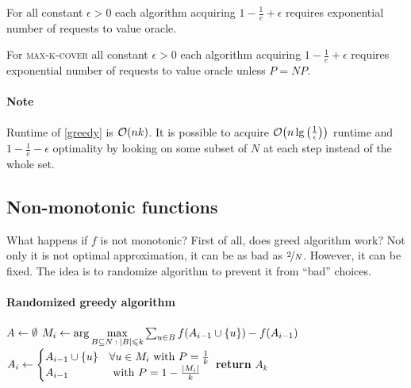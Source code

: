 \begin{theorem} 
	For all constant $\epsilon>0$ each algorithm acquiring $1-\frac{1}{e} + \epsilon$ requires exponential number of requests to value oracle.
\end{theorem}
\begin{theorem}
For \textsc{max-k-cover} all constant $\epsilon>0$ each algorithm acquiring $1-\frac{1}{e} + \epsilon$ requires exponential number of requests to value oracle unless $P=NP$.
\end{theorem}
\paragraph{Note} Runtime of \vref{greedy} is $\order{nk}$. It is possible to acquire $\order{n\lg\qty(\frac{1}{\epsilon})}$ runtime and $1-\frac{1}{e}-\epsilon$ optimality by looking on some subset of $N$ at each step instead of the whole set. 
\subsection{Non-monotonic functions}
What happens if $f$ is not monotonic? First of all, does greed algorithm work? Not only it is not optimal approximation, it can be as bad as $\nicefrac{2}{N}$. However, it can be fixed. The idea is to randomize algorithm to prevent it from ``bad'' choices.


\paragraph{Randomized greedy algorithm}
\begin{algorithm}
	\caption{}\label{rand_greedy}
	\begin{algorithmic}[1]
		\State $A \gets \emptyset$
		\State $ M_i \gets \arg\max\limits_{B\subseteq N \: : \: \abs{B} \leqslant k} \sum_{u\in B} f\qty(A_{i-1} \cup \qty{u} ) - f\qty(A_{i-1})$
		\State $ A_i \gets \begin{cases}
		A_{i-1} \cup \qty{u} & \forall u \in M_i \text{ with } P=\frac{1}{k}\\
		A_{i-1} & \text{ with } P=1-\frac{\abs{M_i}}{k}
		\end{cases} $
		\EndFor
		\State \textbf{return} $A_k$
		\EndProcedure
	\end{algorithmic}
\end{algorithm}

